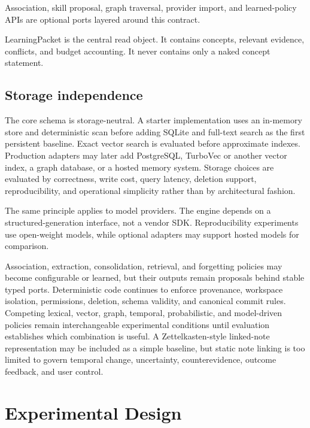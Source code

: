 \documentclass[
  english,
  a4paper,
  DIV=11,
  numbers=noendperiod]{scrreprt}
\begin{document}
Association, skill proposal, graph traversal, provider import, and
learned-policy APIs are optional ports layered around this contract.

LearningPacket is the central read object. It contains concepts,
relevant evidence, conflicts, and budget accounting. It never contains
only a naked concept statement.

\section{Storage independence}\label{storage-independence}

The core schema is storage-neutral. A starter implementation uses an
in-memory store and deterministic scan before adding SQLite and
full-text search as the first persistent baseline. Exact vector search
is evaluated before approximate indexes. Production adapters may later
add PostgreSQL, TurboVec or another vector index, a graph database, or a
hosted memory system. Storage choices are evaluated by correctness,
write cost, query latency, deletion support, reproducibility, and
operational simplicity rather than by architectural fashion.

The same principle applies to model providers. The engine depends on a
structured-generation interface, not a vendor SDK. Reproducibility
experiments use open-weight models, while optional adapters may support
hosted models for comparison.

Association, extraction, consolidation, retrieval, and forgetting
policies may become configurable or learned, but their outputs remain
proposals behind stable typed ports. Deterministic code continues to
enforce provenance, workspace isolation, permissions, deletion, schema
validity, and canonical commit rules. Competing lexical, vector, graph,
temporal, probabilistic, and model-driven policies remain
interchangeable experimental conditions until evaluation establishes
which combination is useful. A Zettelkasten-style linked-note
representation may be included as a simple baseline, but static note
linking is too limited to govern temporal change, uncertainty,
counterevidence, outcome feedback, and user control.


\chapter{Experimental Design}\label{experimental-design}
\end{document}
